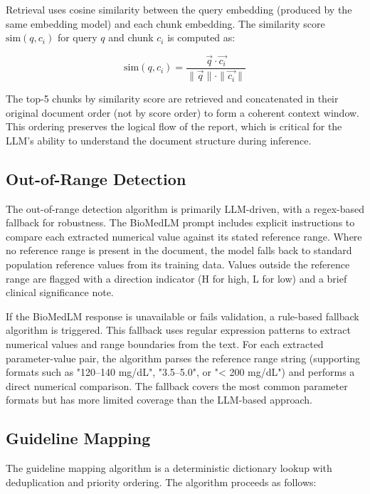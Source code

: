 \documentclass[12pt,a4paper]{report}
\begin{document}
Retrieval uses cosine similarity between the query embedding (produced by the same embedding model) and each chunk embedding. The similarity score $\text{sim}(q, c_i)$ for query $q$ and chunk $c_i$ is computed as:

\[
\text{sim}(q, c_i) = \frac{\vec{q} \cdot \vec{c_i}}{\|\vec{q}\| \cdot \|\vec{c_i}\|}
\]

The top-5 chunks by similarity score are retrieved and concatenated in their original document order (not by score order) to form a coherent context window. This ordering preserves the logical flow of the report, which is critical for the LLM's ability to understand the document structure during inference.

\subsection{Out-of-Range Detection}
The out-of-range detection algorithm is primarily LLM-driven, with a regex-based fallback for robustness. The BioMedLM prompt includes explicit instructions to compare each extracted numerical value against its stated reference range. Where no reference range is present in the document, the model falls back to standard population reference values from its training data. Values outside the reference range are flagged with a direction indicator (H for high, L for low) and a brief clinical significance note.

If the BioMedLM response is unavailable or fails validation, a rule-based fallback algorithm is triggered. This fallback uses regular expression patterns to extract numerical values and range boundaries from the text. For each extracted parameter-value pair, the algorithm parses the reference range string (supporting formats such as "120--140 mg/dL", "3.5--5.0", or "< 200 mg/dL") and performs a direct numerical comparison. The fallback covers the most common parameter formats but has more limited coverage than the LLM-based approach.

\subsection{Guideline Mapping}
The guideline mapping algorithm is a deterministic dictionary lookup with deduplication and priority ordering. The algorithm proceeds as follows:
\end{document}
